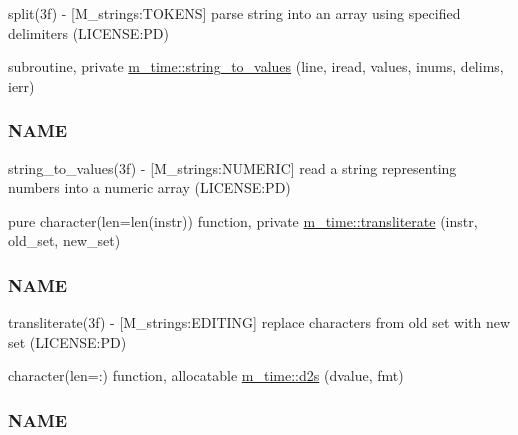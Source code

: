 \begin{DoxyCompactItemize}
\begin{DoxyCompactList}
split(3f) -\/ \mbox{[}M\+\_\+strings\+:T\+O\+K\+E\+NS\mbox{]} parse string into an array using specified delimiters (L\+I\+C\+E\+N\+SE\+:PD) \end{DoxyCompactList}\item 
subroutine, private \mbox{\hyperlink{namespacem__time_aa6ebf9f13e386a27257b5d207fcd3eec}{m\+\_\+time\+::string\+\_\+to\+\_\+values}} (line, iread, values, inums, delims, ierr)
\begin{DoxyCompactList}\small\item\em \subsubsection*{N\+A\+ME}

string\+\_\+to\+\_\+values(3f) -\/ \mbox{[}M\+\_\+strings\+:N\+U\+M\+E\+R\+IC\mbox{]} read a string representing numbers into a numeric array (L\+I\+C\+E\+N\+SE\+:PD) \end{DoxyCompactList}\item 
pure character(len=len(instr)) function, private \mbox{\hyperlink{namespacem__time_a6e202d6d900515a44ab8a7cbb886a68e}{m\+\_\+time\+::transliterate}} (instr, old\+\_\+set, new\+\_\+set)
\begin{DoxyCompactList}\small\item\em \subsubsection*{N\+A\+ME}

transliterate(3f) -\/ \mbox{[}M\+\_\+strings\+:E\+D\+I\+T\+I\+NG\mbox{]} replace characters from old set with new set (L\+I\+C\+E\+N\+SE\+:PD) \end{DoxyCompactList}\item 
character(len=\+:) function, allocatable \mbox{\hyperlink{namespacem__time_a0b88094db657df167f8e57aa4362259e}{m\+\_\+time\+::d2s}} (dvalue, fmt)
\begin{DoxyCompactList}\small\item\em \subsubsection*{N\+A\+ME}


\end{DoxyCompactList}
\end{DoxyCompactItemize}
